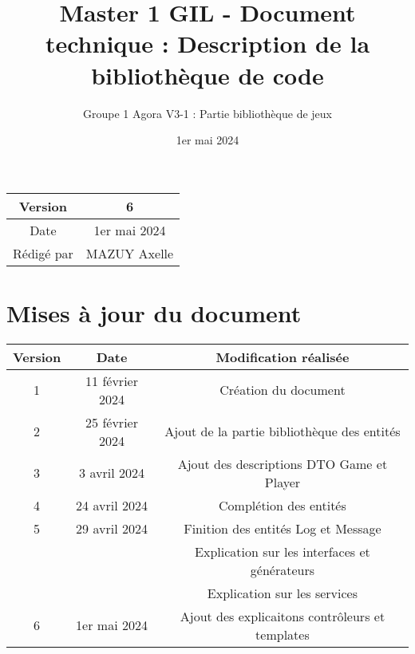 \documentclass{article}
\title{Master 1 GIL - Document technique : Description de la bibliothèque de code}
\author{Groupe 1 Agora V3-1 : Partie bibliothèque de jeux}
\date{1er mai 2024}
\begin{document}
\maketitle
    \begin{center}
        \begin{tabular}{|| c | c ||}
                \hline 
                Version & 6 \\
                \hline 
                Date & 1er mai 2024 \\
                \hline
                Rédigé par & MAZUY Axelle\\
                \hline
        \end{tabular}
    \end{center}

    \newpage
    \section*{Mises à jour du document}

    \begin{center}
        \begin{tabular}{|| c | c | c ||}
                \hline 
                Version & Date & Modification réalisée \\
                \hline
                \hline 
                1 & 11 février 2024 & Création du document \\
                \hline
                2 & 25 février 2024 & Ajout de la partie bibliothèque des entités \\
                \hline
                3 & 3 avril 2024 & Ajout des descriptions DTO Game et Player \\
                \hline
                4 & 24 avril 2024 & Complétion des entités\\
                \hline
                5 & 29 avril 2024 & Finition des entités Log et Message\\
                & & Explication sur les interfaces et générateurs \\
                & & Explication sur les services \\
                \hline
                6 & 1er mai 2024 & Ajout des explicaitons contrôleurs et templates \\
                \hline
        \end{tabular}
    \end{center}

    \newpage
    \tableofcontents
    \newpage
\end{document}
